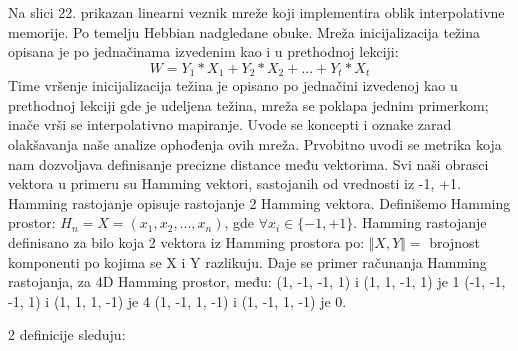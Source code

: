 \documentclass[fontsize=11bp, paper=a4]{scrarticle}
\begin{document}
Na slici 22. prikazan linearni veznik mreže koji implementira oblik interpolativne memorije. Po temelju Hebbian nadgledane obuke. Mreža inicijalizacija težina opisana je po jednačinama izvedenim kao i u prethodnoj lekciji:
$$
W =Y_1* X_1 + Y_2 * X_2 + ... + Y_t *X_t
$$
Time vršenje inicijalizacija težina je opisano po jednačini izvedenoj kao u prethodnoj lekciji gde je udeljena težina, mreža se poklapa jednim primerkom; inače vrši se interpolativno mapiranje.
Uvode se koncepti i oznake zarad olakšavanja naše analize ophođenja ovih mreža. Prvobitno uvodi se metrika koja nam dozvoljava definisanje precizne distance među vektorima. Svi naši obrasci vektora u primeru su Hamming vektori, sastojanih od vrednosti iz {-1, +1}. Hamming rastojanje opisuje rastojanje 2 Hamming vektora. Definišemo Hamming prostor:
$H_n = {X = (x_1, x_2, ..., x_n)}$, gde $\forall x_i \in \{-1, +1\}$.
Hamming rastojanje definisano za bilo koja 2 vektora iz Hamming prostora po:
$\Vert X, Y \Vert =$ brojnost komponenti po kojima se X i Y razlikuju.
Daje se primer računanja Hamming rastojanja, za 4D Hamming prostor, među:
(1, -1, -1, 1) i (1, 1, -1, 1) je 1
(-1, -1, -1, 1) i (1, 1, 1, -1) je 4
(1, -1, 1, -1) i (1, -1, 1, -1) je 0.

2 definicije sleduju:
\end{document}
